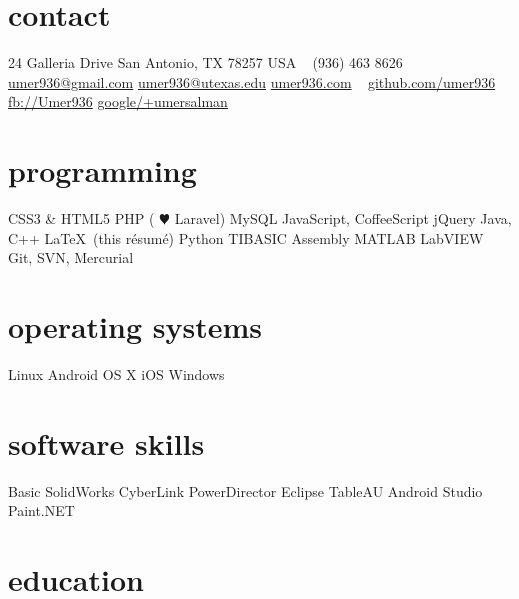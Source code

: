 \documentclass[]{friggeri-cv} %
\begin{document}


\begin{aside} %
	\section{contact}
	24 Galleria Drive
	San Antonio, TX 78257
	USA
	~
	(936) 463 8626
	~
	\href{mailto:umer936@gmail.com}{umer936@gmail.com}
	\href{mailto:umer936@utexas.edu}{umer936@utexas.edu}
	\href{http://umer936.com}{umer936.com}
	~
	\href{http://github.com/umer936}{github.com/umer936}
	\href{http://facebook.com/Umer936}{fb://Umer936}
	\href{http://google.com/+umersalman}{google/+umersalman}
	~
	\section{programming}
	CSS3 \& HTML5
	PHP ({\color{red} $\varheartsuit$} Laravel)
	MySQL
	JavaScript, CoffeeScript
	jQuery
	Java, C++
	\LaTeX \ (this r\'esum\'e)
	Python
	TIBASIC
	Assembly
	MATLAB
	LabVIEW
	Git, SVN, Mercurial
	~
	\section{operating systems}
	Linux
	Android
	OS X
	iOS
	Windows
	~
	\section{software skills}
	Basic SolidWorks
	CyberLink PowerDirector
	Eclipse
	TableAU
	Android Studio
	Paint.NET
\end{aside}


\section{education}
\end{document}
